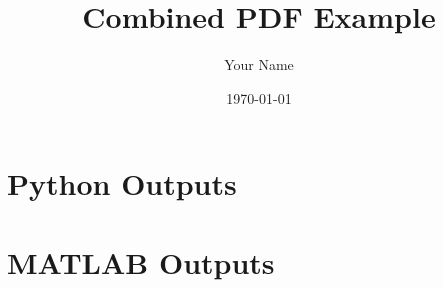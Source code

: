 \documentclass{article}
\begin{document}
\title{Combined PDF Example}
\author{Your Name}
\date{\today}

\maketitle

\section{Python Outputs}

\section{MATLAB Outputs}
\end{document}
